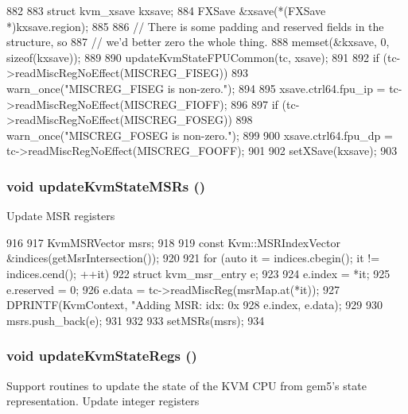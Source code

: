 \begin{DoxyCode}
882 {
883     struct kvm_xsave kxsave;
884     FXSave &xsave(*(FXSave *)kxsave.region);
885 
886     // There is some padding and reserved fields in the structure, so
887     // we'd better zero the whole thing.
888     memset(&kxsave, 0, sizeof(kxsave));
889 
890     updateKvmStateFPUCommon(tc, xsave);
891 
892     if (tc->readMiscRegNoEffect(MISCREG_FISEG))
893         warn_once("MISCREG_FISEG is non-zero.\n");
894 
895     xsave.ctrl64.fpu_ip = tc->readMiscRegNoEffect(MISCREG_FIOFF);
896 
897     if (tc->readMiscRegNoEffect(MISCREG_FOSEG))
898         warn_once("MISCREG_FOSEG is non-zero.\n");
899 
900     xsave.ctrl64.fpu_dp = tc->readMiscRegNoEffect(MISCREG_FOOFF);
901 
902     setXSave(kxsave);
903 }
\end{DoxyCode}
\hypertarget{classX86KvmCPU_ad04202aafaacd818cf2621c5a31926c1}{
\subsubsection[{updateKvmStateMSRs}]{\setlength{\rightskip}{0pt plus 5cm}void updateKvmStateMSRs ()}}
\label{classX86KvmCPU_ad04202aafaacd818cf2621c5a31926c1}
Update MSR registers 


\begin{DoxyCode}
916 {
917     KvmMSRVector msrs;
918 
919     const Kvm::MSRIndexVector &indices(getMsrIntersection());
920 
921     for (auto it = indices.cbegin(); it != indices.cend(); ++it) {
922         struct kvm_msr_entry e;
923 
924         e.index = *it;
925         e.reserved = 0;
926         e.data = tc->readMiscReg(msrMap.at(*it));
927         DPRINTF(KvmContext, "Adding MSR: idx: 0x%
928                 e.index, e.data);
929 
930         msrs.push_back(e);
931     }
932 
933     setMSRs(msrs);
934 }
\end{DoxyCode}
\hypertarget{classX86KvmCPU_a54e3879c7bcd8aac9d1b88350e7674fe}{
\subsubsection[{updateKvmStateRegs}]{\setlength{\rightskip}{0pt plus 5cm}void updateKvmStateRegs ()}}
\label{classX86KvmCPU_a54e3879c7bcd8aac9d1b88350e7674fe}
Support routines to update the state of the KVM CPU from gem5's state representation. Update integer registers 



